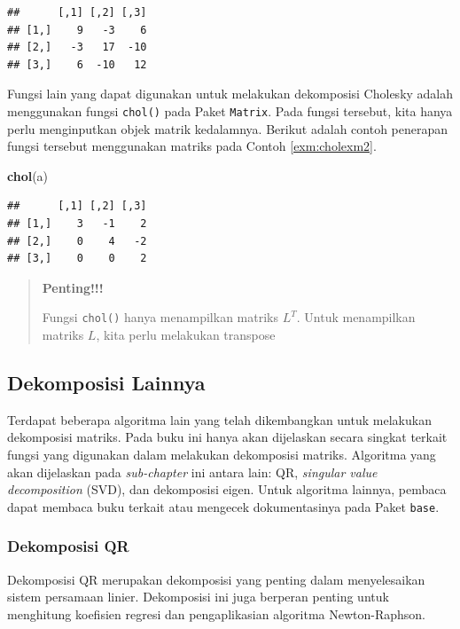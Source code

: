 \documentclass[]{book}
\newenvironment{Shaded}{\begin{snugshade}}{\end{snugshade}}
\newcommand{\KeywordTok}[1]{\textcolor[rgb]{0.13,0.29,0.53}{\textbf{#1}}}
\newcommand{\NormalTok}[1]{#1}
\theoremstyle{definition}
\theoremstyle{definition}
\theoremstyle{definition}
\theoremstyle{remark}
\begin{document}
\begin{verbatim}
##      [,1] [,2] [,3]
## [1,]    9   -3    6
## [2,]   -3   17  -10
## [3,]    6  -10   12
\end{verbatim}

Fungsi lain yang dapat digunakan untuk melakukan dekomposisi Cholesky adalah menggunakan fungsi \texttt{chol()} pada Paket \texttt{Matrix}. Pada fungsi tersebut, kita hanya perlu menginputkan objek matrik kedalamnya. Berikut adalah contoh penerapan fungsi tersebut menggunakan matriks pada Contoh \ref{exm:cholexm2}.

\begin{Shaded}
\begin{Highlighting}[]
\KeywordTok{chol}\NormalTok{(a)}
\end{Highlighting}
\end{Shaded}

\begin{verbatim}
##      [,1] [,2] [,3]
## [1,]    3   -1    2
## [2,]    0    4   -2
## [3,]    0    0    2
\end{verbatim}

\begin{quote}
\textbf{Penting!!!}

Fungsi \texttt{chol()} hanya menampilkan matriks \(L^T\). Untuk menampilkan matriks \(L\), kita perlu melakukan transpose
\end{quote}

\hypertarget{othersdecomp}{%
\subsection{Dekomposisi Lainnya}\label{othersdecomp}}

Terdapat beberapa algoritma lain yang telah dikembangkan untuk melakukan dekomposisi matriks. Pada buku ini hanya akan dijelaskan secara singkat terkait fungsi yang digunakan dalam melakukan dekomposisi matriks. Algoritma yang akan dijelaskan pada \emph{sub-chapter} ini antara lain: QR, \emph{singular value decomposition} (SVD), dan dekomposisi eigen. Untuk algoritma lainnya, pembaca dapat membaca buku terkait atau mengecek dokumentasinya pada Paket \texttt{base}.

\hypertarget{qrdecomp}{%
\subsubsection{Dekomposisi QR}\label{qrdecomp}}

Dekomposisi QR merupakan dekomposisi yang penting dalam menyelesaikan sistem persamaan linier. Dekomposisi ini juga berperan penting untuk menghitung koefisien regresi dan pengaplikasian algoritma Newton-Raphson.
\end{document}
